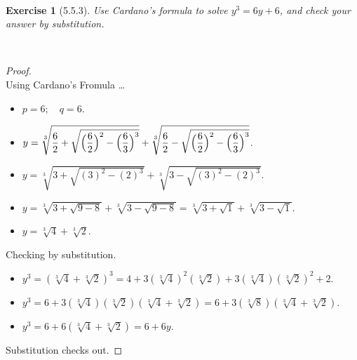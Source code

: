 \documentclass[12pt]{article}
\newcommand{\XB}{\color{black}}
\newcommand{\XBB}{\color{blue}}
\newcommand{\ds}{\displaystyle}
\theoremstyle{plain}
\newtheorem{ex}{Exercise}
\begin{document}
\newpage

\XBB\hrulefill\XB \\
\begin{ex} [5.5.3]
  Use Cardano's formula to solve $ y^{3} = 6y + 6 $, and check your answer by substitution.
\end{ex}
\XBB\hrulefill\XB \\

\begin{proof}
  \ \\

  Using Cardano's Fromula \dots


  \begin{itemize}
    \item $ \ds p = 6 ; \quad q = 6 $.
    \item $ \ds y = \sqrt[3]{ \ds \frac{6}{2} + \sqrt{ \ds \Bigl( \frac{6}{2} \Bigr)^{2} - \Bigl( \frac{6}{3} \Bigr)^{3} }} + \sqrt[3]{ \ds \frac{6}{2} - \sqrt{ \ds \Bigl( \frac{6}{2} \Bigr)^{2} - \Bigl( \frac{6}{3} \Bigr)^{3} }} $.
    \item $ \ds y = \sqrt[3]{ \ds 3 + \sqrt{ \ds ( 3 )^{2} - ( 2 )^{3} }} + \sqrt[3]{ \ds 3 - \sqrt{ \ds ( 3 )^{2} - ( 2 )^{3} }} $.
    \item $ \ds y = \sqrt[3]{ \ds 3 + \sqrt{ \ds 9 - 8 }} + \sqrt[3]{ \ds 3 - \sqrt{ \ds 9 - 8 }} = \sqrt[3]{ \ds 3 + \sqrt{ \ds 1 }} + \sqrt[3]{ \ds 3 - \sqrt{ \ds 1 }} $.
    \item $ \ds y = \sqrt[3]{ \ds 4 } + \sqrt[3]{ \ds 2 } $.
  \end{itemize}

  Checking by substitution.
  
  \begin{itemize}
    \item $ \ds y^{3} = (\sqrt[3]{ \ds 4 } + \sqrt[3]{ \ds 2 })^{3} = 4 + 3(\sqrt[3]{ \ds 4 })^{2}(\sqrt[3]{ \ds 2 }) + 3(\sqrt[3]{ \ds 4 })(\sqrt[3]{ \ds 2 })^{2} + 2 $. 
    \item $ \ds y^{3} = 6 + 3(\sqrt[3]{ \ds 4 })(\sqrt[3]{ \ds 2 })(\sqrt[3]{ \ds 4 } + \sqrt[3]{ \ds 2 }) = 6 + 3(\sqrt[3]{ \ds 8 })(\sqrt[3]{ \ds 4 } + \sqrt[3]{ \ds 2 }) $. 
    \item $ \ds y^{3} = 6 + 6(\sqrt[3]{ \ds 4 } + \sqrt[3]{ \ds 2 }) = 6 + 6y $. 
\end{itemize}

    Substitution checks out.

\end{proof}
\end{document}
